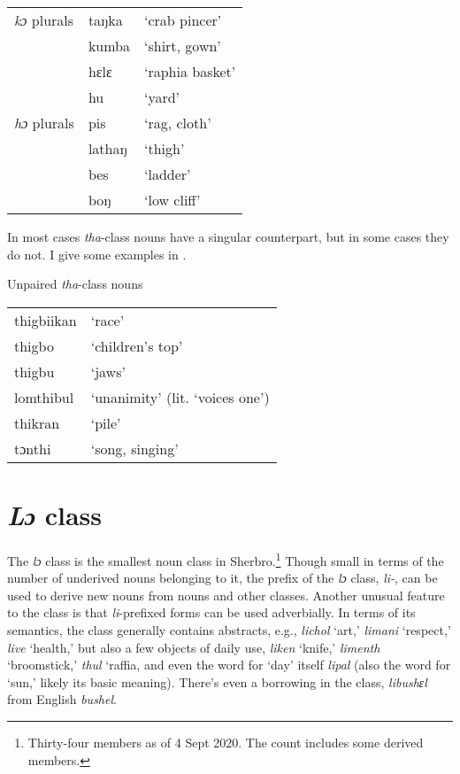     \vspace{6pt}
    
    \begin{tabular}{lll}
    \textit{kɔ} plurals & taŋka & ‘crab pincer'\\
                        &  kumba & ‘shirt, gown'\\
                        & hɛlɛ & ‘raphia basket'\\
                        & hu & ‘yard'\\
    \textit{hɔ} plurals & pis & ‘rag, cloth'\\
                        & lathaŋ & ‘thigh'\\
                        & bes & ‘ladder'\\
                        & boŋ & ‘low cliff'\\
    \end{tabular}
\z

In most cases \textit{tha}{}-class nouns have a singular counterpart, but in some cases they do not. I give some examples in .

\ea%
    \label{ex:154}
    Unpaired \textit{tha}{}-class nouns\\

     \vspace{6pt}
    
    \begin{tabular}{ll}
    thigbiikan & ‘race'\\
    thigbo & ‘children's top'\\
    thigbu & ‘jaws'\\
    lomthibul & ‘unanimity' (lit. ‘voices one')\\
    thikran & ‘pile'\\
    tɔnthi & ‘song, singing'\\
\end{tabular}
\z

\section{\textit{Lɔ} class}
\label{sec:5.10}\hypertarget{Toc115517797}{}
The \textit{lɔ} class is the smallest noun class in Sherbro.\footnote{Thirty-four members as of 4 Sept 2020. The count includes some derived members.} Though small in terms of the number of underived nouns belonging to it, the prefix of the \textit{lɔ} class, \textit{li-}, can be used to derive new nouns from nouns and other classes. Another unusual feature to the class is that \textit{li}{}-prefixed forms can be used adverbially. In terms of its semantics, the class generally contains abstracts, e.g., \textit{lichol} ‘art,' \textit{limani} ‘respect,' \textit{live} ‘health,' but also a few objects of daily use, \textit{liken} ‘knife,' \textit{limenth} ‘broomstick,' \textit{thul} ‘raffia, and even the word for ‘day' itself \textit{lipal} (also the word for ‘sun,' likely its basic meaning). There's even a borrowing in the class, \textit{libushɛl} from English \textit{bushel}.

